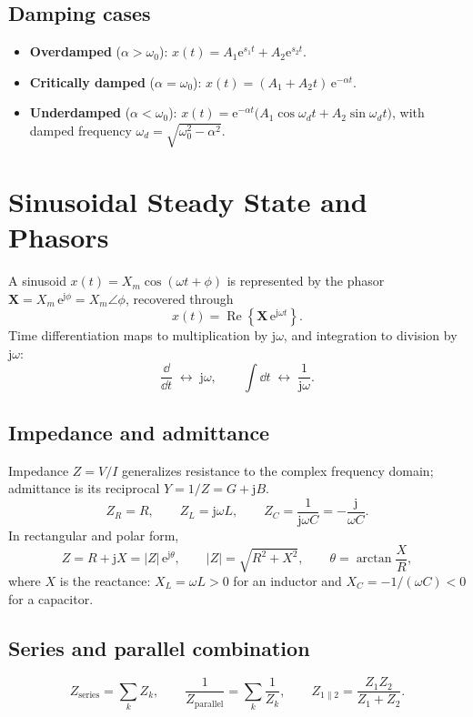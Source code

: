 \documentclass{essay}
\newcommand{\ee}{\mathrm{e}}
\newcommand{\jj}{\mathrm{j}}
\renewcommand{\Re}{\operatorname{Re}}
\begin{document}
\subsection{Damping cases}
\begin{itemize}
  \item \textbf{Overdamped} ($\alpha > \omega_0$):
    $x(t) = A_1\ee^{s_1 t} + A_2\ee^{s_2 t}$.
  \item \textbf{Critically damped} ($\alpha = \omega_0$):
    $x(t) = (A_1 + A_2 t)\,\ee^{-\alpha t}$.
  \item \textbf{Underdamped} ($\alpha < \omega_0$):
    $x(t) = \ee^{-\alpha t}\bigl(A_1\cos\omega_d t + A_2\sin\omega_d t\bigr)$,
    with damped frequency $\omega_d = \sqrt{\omega_0^2 - \alpha^2}$.
\end{itemize}

\section{Sinusoidal Steady State and Phasors}

A sinusoid $x(t) = X_m\cos(\omega t + \phi)$ is represented by the phasor
$\mathbf{X} = X_m\,\ee^{\jj\phi} = X_m\angle\phi$, recovered through
\[
  x(t) = \Re\!\left\{\mathbf{X}\,\ee^{\jj\omega t}\right\}.
\]
Time differentiation maps to multiplication by $\jj\omega$, and integration to
division by $\jj\omega$:
\[
  \frac{\dd}{\dd t} \;\longleftrightarrow\; \jj\omega, \qquad
  \int \dd t \;\longleftrightarrow\; \frac{1}{\jj\omega}.
\]

\subsection{Impedance and admittance}
Impedance $Z = V/I$ generalizes resistance to the complex frequency domain;
admittance is its reciprocal $Y = 1/Z = G + \jj B$.
\[
  Z_R = R, \qquad
  Z_L = \jj\omega L, \qquad
  Z_C = \frac{1}{\jj\omega C} = -\frac{\jj}{\omega C}.
\]
In rectangular and polar form,
\[
  Z = R + \jj X = |Z|\,\ee^{\jj\theta}, \qquad
  |Z| = \sqrt{R^2 + X^2}, \qquad
  \theta = \arctan\!\frac{X}{R},
\]
where $X$ is the reactance: $X_L = \omega L > 0$ for an inductor and
$X_C = -1/(\omega C) < 0$ for a capacitor.

\subsection{Series and parallel combination}
\[
  Z_{\text{series}} = \sum_k Z_k, \qquad
  \frac{1}{Z_{\text{parallel}}} = \sum_k \frac{1}{Z_k}, \qquad
  Z_{1\parallel 2} = \frac{Z_1 Z_2}{Z_1 + Z_2}.
\]
\end{document}

